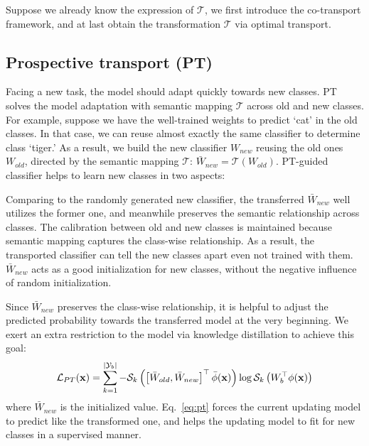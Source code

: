 \documentclass[sigconf]{acmart}
\newcommand{\x}{{\bf x}}
\newcommand{\T}{\mathcal{T}}
\begin{document}
Suppose we already know the expression of $\T$, we first introduce the co-transport framework, and at last obtain the transformation $\T$ via optimal transport.




\subsection{Prospective transport (PT)}
Facing a new task, the model should adapt quickly towards new classes. PT solves the model adaptation with semantic mapping $\T$ across old and new classes.
For example, suppose we have the well-trained weights to predict `cat' in the old classes. In that case, we can reuse almost exactly the same classifier to determine class `tiger.' As a result, we build the new classifier $W_{new}$ reusing the old ones $W_{old}$, directed by the semantic mapping $\T$: $\bar{W}_{new}= \T(W_{old})$. PT-guided classifier helps to learn new classes in two aspects:

 Comparing to the randomly generated new classifier, the transferred $\bar{W}_{new}$ well utilizes the former one, and meanwhile preserves the semantic relationship across classes. The calibration between old and new classes is maintained because semantic mapping captures the class-wise relationship. As a result, the transported classifier can tell  the new classes apart even not trained with them. $\bar{W}_{new}$ acts as a good initialization for new classes, without the negative influence of random initialization.

 Since $\bar{W}_{new}$ preserves the class-wise relationship, it is helpful to adjust the predicted probability towards the transferred model at the very beginning.
We exert an extra restriction to the model via knowledge distillation to achieve this goal:
\begin{align}
	\label{eq:pt}
	\mathcal{L}_{PT}(\mathbf{x}) = \sum_{k=1}^{|\mathcal{Y}_{b}|}-
	\mathcal{S}_k\left({\left[\bar{W}_{old},\bar{W}_{new}\right]^{\top}\bar{\phi}(\x)}\right)
	\log \mathcal{S}_k\left({W_{b}^{\top}\phi(\x)}\right) 
\end{align}
where $\bar{W}_{new}$ is the initialized value. Eq.~\ref{eq:pt} forces the current updating model to predict like the transformed one, and helps the updating model 
to fit for new classes in a supervised manner.
\end{document}
